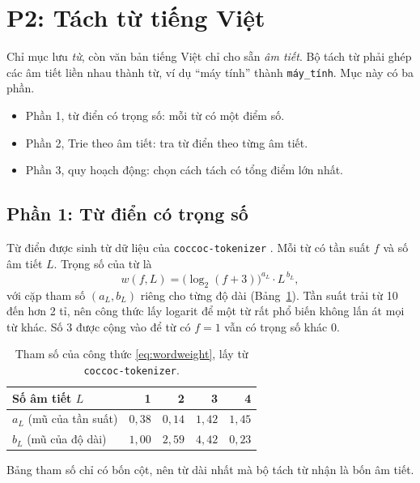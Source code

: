 \documentclass[9pt,twocolumn,a4paper]{extarticle}
\newcommand{\code}[1]{\texttt{#1}}
\begin{document}
\section{P2: Tách từ tiếng Việt}
\label{chap:p2}
Chỉ mục lưu \emph{từ}, còn văn bản tiếng Việt chỉ cho sẵn \emph{âm tiết}. Bộ tách từ phải ghép các âm tiết liền nhau thành từ, ví dụ ``máy tính'' thành \code{máy\_tính}. Mục này có ba phần.
\begin{itemize}\itemsep0pt
\item Phần 1, từ điển có trọng số: mỗi từ có một điểm số.
\item Phần 2, Trie theo âm tiết: tra từ điển theo từng âm tiết.
\item Phần 3, quy hoạch động: chọn cách tách có tổng điểm lớn nhất.
\end{itemize}

\subsection{Phần 1: Từ điển có trọng số}
\label{sec:dict}
Từ điển được sinh từ dữ liệu của \code{coccoc-tokenizer} \cite{coccoctokenizer}. Mỗi từ có tần suất $f$ và số âm tiết $L$. Trọng số của từ là
\begin{equation}
w(f,L)=\big(\log_2(f+3)\big)^{a_L}\cdot L^{\,b_L},
\label{eq:wordweight}
\end{equation}
với cặp tham số $(a_L,b_L)$ riêng cho từng độ dài (Bảng~\ref{tab:param}). Tần suất trải từ 10 đến hơn 2 tỉ, nên công thức lấy logarit để một từ rất phổ biến không lấn át mọi từ khác. Số 3 được cộng vào để từ có $f=1$ vẫn có trọng số khác 0.

\begin{table}[H]
\centering
\caption{Tham số của công thức \eqref{eq:wordweight}, lấy từ \code{coccoc-tokenizer}.}
\label{tab:param}
\footnotesize
\begin{tabular}{@{}lrrrr@{}}
\toprule
Số âm tiết $L$ & 1 & 2 & 3 & 4 \\
\midrule
$a_L$ (mũ của tần suất) & $0{,}38$ & $0{,}14$ & $1{,}42$ & $1{,}45$ \\
$b_L$ (mũ của độ dài) & $1{,}00$ & $2{,}59$ & $4{,}42$ & $0{,}23$ \\
\bottomrule
\end{tabular}
\end{table}

Bảng tham số chỉ có bốn cột, nên từ dài nhất mà bộ tách từ nhận là bốn âm tiết.
\end{document}
